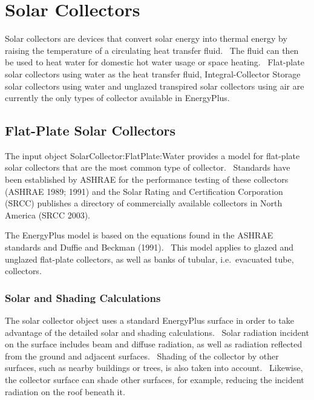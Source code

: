 \section{Solar Collectors }\label{solar-collectors}

Solar collectors are devices that convert solar energy into thermal energy by raising the temperature of a circulating heat transfer fluid.~ The fluid can then be used to heat water for domestic hot water usage or space heating.~ Flat-plate solar collectors using water as the heat transfer fluid, Integral-Collector Storage solar collectors using water and unglazed transpired solar collectors using air are currently the only types of collector available in EnergyPlus.

\subsection{Flat-Plate Solar Collectors}\label{flat-plate-solar-collectors}

The input object SolarCollector:FlatPlate:Water provides a model for flat-plate solar collectors that are the most common type of collector.~ Standards have been established by ASHRAE for the performance testing of these collectors (ASHRAE 1989; 1991) and the Solar Rating and Certification Corporation (SRCC) publishes a directory of commercially available collectors in North America (SRCC 2003).

The EnergyPlus model is based on the equations found in the ASHRAE standards and Duffie and Beckman (1991).~ This model applies to glazed and unglazed flat-plate collectors, as well as banks of tubular, i.e.~evacuated tube, collectors.

\subsubsection{Solar and Shading Calculations}\label{solar-and-shading-calculations-000}

The solar collector object uses a standard EnergyPlus surface in order to take advantage of the detailed solar and shading calculations.~ Solar radiation incident on the surface includes beam and diffuse radiation, as well as radiation reflected from the ground and adjacent surfaces.~ Shading of the collector by other surfaces, such as nearby buildings or trees, is also taken into account.~ Likewise, the collector surface can shade other surfaces, for example, reducing the incident radiation on the roof beneath it.

